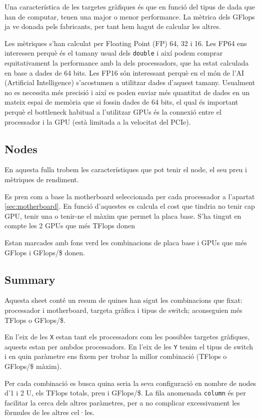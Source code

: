 Una característica de les targetes gràfiques és que en funció del tipus de dada que han de computar, tenen una major o menor performance. La mètrica dels GFlops ja ve donada pels fabricants, per tant hem hagut de calcular les altres. 

Les mètriques s'han calculat per Floating Point (FP) 64, 32 i 16.
Les FP64 ens interessen perquè és el tamany usual dels \texttt{double} i així podem comprar equitativament la performance amb la dels processadors, que ha estat calculada en base a dades de 64 bits.
Les FP16 són interessant perquè en el món de l'AI (Artificial Intelligence) s'acostumen a utilitzar dades d'aquest tamany. Usualment no es necessita més precisió i així es poden enviar més quantitat de dades en un mateix espai de memòria que si fossin dades de 64 bits, el qual és important perquè el bottleneck habitual a l'utilitzar GPUs és la connexió entre el processador i la GPU (està limitada a la velocitat del PCIe).

\subsection{Nodes}
En aquesta fulla trobem les característiques que pot tenir el node, el seu preu i mètriques de rendiment.

Es pren com a base la motherboard seleccionada per cada processador a l'apartat \ref{sec:motherboard}. En funció d'aquestes es calcula el cost que tindria no tenir cap GPU, tenir una o tenir-ne el màxim que permet la placa base. S'ha tingut en compte les 2 GPUs que més TFlops donen

Estan marcades amb fons verd les combinacions de placa base i GPUs que més GFlops i GFlops/\$ donen.

\subsection{Summary}
Aquesta sheet conté un resum de quines han sigut les combinacions que fixat: processador i motherboard, targeta gràfica i tipus de switch; aconseguien més TFlops o GFlops/\$.

En l'eix de les \texttt{X} estan tant els processadors com les possibles targetes gràfiques, aquests estan per ambdos processadors. En l'eix de les \texttt{Y} tenim el tipus de switch i en quin paràmetre ens fixem per trobar la millor combinació (TFlops o GFlops/\$ màxim).

Per cada combinació es busca quina seria la seva configuració en nombre de nodes d'1 i 2 U, els TFlops totals, preu i GFlops/\$. La fila anomenada \texttt{column} és per facilitar la cerca dels altres paràmetres, per a no complicar excessivament les fòrmules de les altres cel·les.

